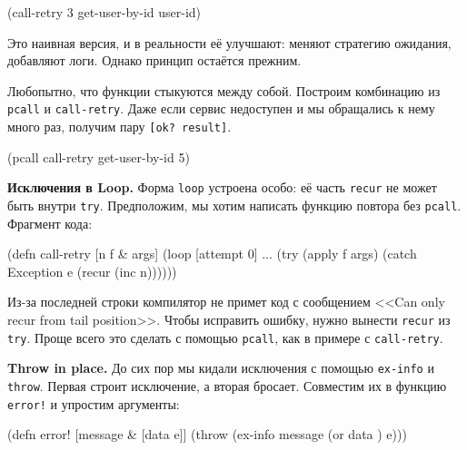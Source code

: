\begin{english}
  \begin{clojure}
(call-retry 3 get-user-by-id user-id)
  \end{clojure}
\end{english}

Это наивная версия, и в реальности её улучшают: меняют стратегию ожидания,
добавляют логи. Однако принцип остаётся прежним.

Любопытно, что функции стыкуются между собой. Построим комбинацию из
\verb|pcall| и \verb|call-retry|. Даже если сервис недоступен и мы обращались к
нему много раз, получим пару \verb|[ok? result]|.

\begin{english}
  \begin{clojure}
(pcall call-retry get-user-by-id 5)
  \end{clojure}
\end{english}

\textbf{Исключения в Loop.} Форма \verb|loop| устроена особо: её часть
\verb|recur| не может быть внутри \verb|try|. Предположим, мы хотим написать
функцию повтора без \verb|pcall|. Фрагмент кода:


\begin{english}
  \begin{clojure}
(defn call-retry [n f & args]
  (loop [attempt 0]
    ...
    (try
      (apply f args)
      (catch Exception e
        (recur (inc n))))))
  \end{clojure}
\end{english}

Из-за последней строки компилятор не примет код с сообщением <<Can only recur
from tail position>>. Чтобы исправить ошибку, нужно вынести \verb|recur| из
\verb|try|. Проще всего это сделать с помощью \verb|pcall|, как в примере с
\verb|call-retry|.

\textbf{Throw in place.} До сих пор мы кидали исключения с помощью
\verb|ex-info| и \verb|throw|. Первая строит исключение, а вторая
бросает. Совместим их в функцию \verb|error!| и упростим аргументы:


\ifnarrow

\begin{english}
  \begin{clojure}
(defn error! [message & [data e]]
  (throw (ex-info message
           (or data {}) e)))
  \end{clojure}
\end{english}

